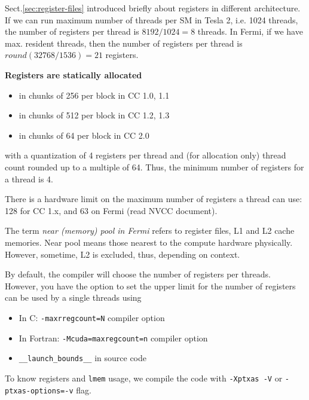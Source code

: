 Sect.\ref{sec:register-files} introduced briefly about registers in different
architecture. If we can run maximum number of threads per SM in Tesla 2, i.e. 1024
threads, the number of registers per thread is $8192/1024=8$ threads.
In Fermi, if we have max. resident threads, then the number of
registers per thread is $round(32768/1536) = 21$ registers.

{\bf Registers are statically allocated }
\begin{itemize}
\item in chunks of 256 per block in CC 1.0, 1.1
\item in chunks of 512 per block in CC 1.2, 1.3
\item in chunks of 64 per block in CC 2.0
\end{itemize}
with a quantization of 4 registers per thread and (for allocation
only) thread count rounded up to a multiple of 64. Thus, the minimum
number of registers for a thread is 4.

\begin{framed}
  There is a hardware limit on the maximum number of registers a thread
  can use: 128 for CC 1.x, and 63 on Fermi (read NVCC document).
  
  The term {\it near (memory) pool in Fermi} refers to register
  files, L1 and L2 cache memories. Near pool means those nearest to
  the compute hardware physically. However, sometime, L2 is excluded,
  thus, depending on context.
\end{framed}


By default, the compiler will choose the number of registers per
threads. However, you have the option to set the upper limit for the
number of registers can be used by a single threads using 
\begin{itemize}
\item In C: \verb!-maxrregcount=N! compiler option
\item In Fortran: \verb!-Mcuda=maxregcount=n! compiler option
\item \verb!__launch_bounds__! in source code
\end{itemize}
To know registers and \verb!lmem! usage, we compile the code with
\verb!-Xptxas -V! or \verb!-ptxas-options=-v! flag.


